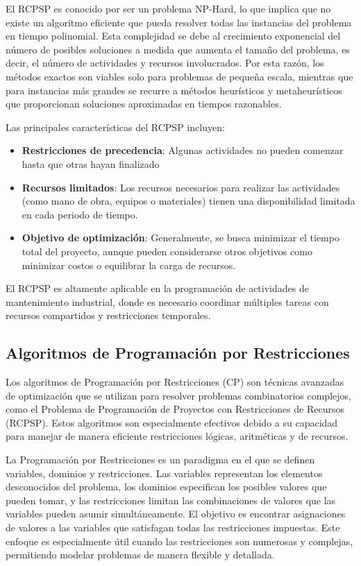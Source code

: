 \documentclass{article}
\begin{document}
El RCPSP es conocido por ser un problema NP-Hard, lo que implica que no existe un algoritmo eficiente que pueda resolver todas las instancias del problema en tiempo polinomial. Esta complejidad se debe al crecimiento exponencial del número de posibles soluciones a medida que aumenta el tamaño del problema, es decir, el número de actividades y recursos involucrados. Por esta razón, los métodos exactos son viables solo para problemas de pequeña escala, mientras que para instancias más grandes se recurre a métodos heurísticos y metaheurísticos que proporcionan soluciones aproximadas en tiempos razonables.

Las principales características del RCPSP incluyen:
\begin{itemize}
  \item \textbf{Restricciones de precedencia}: Algunas actividades no pueden comenzar hasta que otras hayan finalizado
  \item \textbf{Recursos limitados}: Los recursos necesarios para realizar las actividades (como mano de obra, equipos o materiales) tienen una disponibilidad limitada en cada periodo de tiempo.
  \item \textbf{Objetivo de optimización}: Generalmente, se busca minimizar el tiempo total del proyecto, aunque pueden considerarse otros objetivos como minimizar costos o equilibrar la carga de recursos.
\end{itemize}

El RCPSP es altamente aplicable en la programación de actividades de mantenimiento industrial, donde es necesario coordinar múltiples tareas con recursos compartidos y restricciones temporales.

\subsection{Algoritmos de Programación por Restricciones}
Los algoritmos de Programación por Restricciones (CP) son técnicas avanzadas de optimización que se utilizan para resolver problemas combinatorios complejos, como el Problema de Programación de Proyectos con Restricciones de Recursos (RCPSP). Estos algoritmos son especialmente efectivos debido a su capacidad para manejar de manera eficiente restricciones lógicas, aritméticas y de recursos.

La Programación por Restricciones es un paradigma en el que se definen variables, dominios y restricciones. Las variables representan los elementos desconocidos del problema, los dominios especifican los posibles valores que pueden tomar, y las restricciones limitan las combinaciones de valores que las variables pueden asumir simultáneamente. El objetivo es encontrar asignaciones de valores a las variables que satisfagan todas las restricciones impuestas. Este enfoque es especialmente útil cuando las restricciones son numerosas y complejas, permitiendo modelar problemas de manera flexible y detallada.
\end{document}
